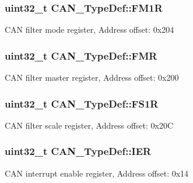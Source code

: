 \subsubsection[{\texorpdfstring{F\+M1R}{FM1R}}]{ uint32\+\_\+t C\+A\+N\+\_\+\+Type\+Def\+::\+F\+M1R}\hypertarget{struct_c_a_n___type_def_aefe6a26ee25947b7eb5be9d485f4d3b0}{}\label{struct_c_a_n___type_def_aefe6a26ee25947b7eb5be9d485f4d3b0}
C\+AN filter mode register, Address offset\+: 0x204 
\subsubsection[{\texorpdfstring{F\+MR}{FMR}}]{ uint32\+\_\+t C\+A\+N\+\_\+\+Type\+Def\+::\+F\+MR}\hypertarget{struct_c_a_n___type_def_a1a6a0f78ca703a63bb0a6b6f231f612f}{}\label{struct_c_a_n___type_def_a1a6a0f78ca703a63bb0a6b6f231f612f}
C\+AN filter master register, Address offset\+: 0x200 
\subsubsection[{\texorpdfstring{F\+S1R}{FS1R}}]{ uint32\+\_\+t C\+A\+N\+\_\+\+Type\+Def\+::\+F\+S1R}\hypertarget{struct_c_a_n___type_def_ac6296402924b37966c67ccf14a381976}{}\label{struct_c_a_n___type_def_ac6296402924b37966c67ccf14a381976}
C\+AN filter scale register, Address offset\+: 0x20C 
\subsubsection[{\texorpdfstring{I\+ER}{IER}}]{ uint32\+\_\+t C\+A\+N\+\_\+\+Type\+Def\+::\+I\+ER}\hypertarget{struct_c_a_n___type_def_a530babbc4b9584c93a1bf87d6ce8b8dc}{}\label{struct_c_a_n___type_def_a530babbc4b9584c93a1bf87d6ce8b8dc}
C\+AN interrupt enable register, Address offset\+: 0x14 
